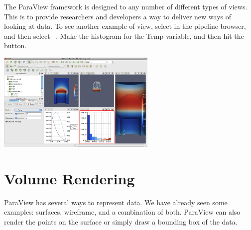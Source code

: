 The ParaView framework is designed to any number of different types of
views.  This is to provide researchers and developers a way to deliver new
ways of looking at data.  To see another example of view, select
 in the pipeline browser, and then select
 \ra {} \ra
{}~.  Make the histogram
for the Temp variable, and then hit the \apply button.

\begin{inlinefig}
  \includegraphics[width=3in]{images/HistogramPlot}
\end{inlinefig}


\section{Volume Rendering}

ParaView has several ways to represent data.  We have already seen some
examples: surfaces, wireframe, and a combination of both.  ParaView can
also render the points on the surface or simply draw a bounding box of the
data.

